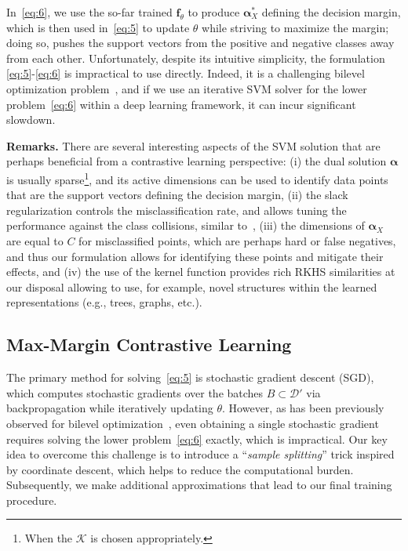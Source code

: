 \documentclass[letterpaper]{article} \usepackage{aaai22}  \usepackage{times}  \usepackage{helvet}  \usepackage{courier}  \usepackage[hyphens]{url}  \usepackage{graphicx} \urlstyle{rm} \def\UrlFont{\rm}  \usepackage{natbib}  \usepackage{caption} \DeclareCaptionStyle{ruled}{labelfont=normalfont,labelsep=colon,strut=off} \frenchspacing  \setlength{\pdfpagewidth}{8.5in}  \setlength{\pdfpageheight}{11in}
\newcommand{\valpha}{\bm{\alpha}}
\newcommand{\dataset}{\mathcal{D}}
\newcommand{\kernel}{\mathcal{K}}
\newcommand{\ft}{\bm{f}_\theta}
\begin{document}
In~\eqref{eq:6}, we use the so-far trained $\ft$ to produce $\valpha_X^*$ defining the decision margin, which is then used in~\eqref{eq:5} to update $\theta$ while striving to maximize the margin; doing so, pushes the support vectors from the positive and negative classes away from each other. Unfortunately, despite its intuitive simplicity, the formulation \eqref{eq:5}-\eqref{eq:6} is impractical to use directly. Indeed, it is a challenging bilevel optimization problem~\cite{gould2016differentiating,amos2017optnet,wang2018video}, and if we use an iterative SVM solver for the lower problem~\eqref{eq:6} within a deep learning framework, it can incur significant slowdown. 

\textbf{Remarks.} There are several interesting aspects of the SVM solution that are perhaps beneficial from a contrastive learning perspective: (i) the dual solution $\valpha$ is usually sparse\footnote{When the $\kernel$ is chosen appropriately.}, and its active dimensions can be used to identify data points that are the support vectors defining the decision margin, (ii) the slack regularization controls the misclassification rate, and allows tuning the performance against the class collisions, similar to~\cite{chuang2020debiased}, (iii) the dimensions of $\valpha_{X}$ are equal to $C$ for misclassified points, which are perhaps hard or false negatives, and thus our formulation allows for identifying these points and mitigate their effects, and (iv) the use of the kernel function provides rich RKHS similarities at our disposal allowing to use, for example, novel structures within the learned representations (e.g., trees, graphs, etc.). 

\subsection{Max-Margin Contrastive Learning}
\label{sec:mmcl}
The primary method for solving~\eqref{eq:5} is stochastic gradient descent (SGD), which computes stochastic gradients over the batches $B \subset \dataset'$ via backpropagation while iteratively updating $\theta$. However, as has been previously observed for bilevel optimization~\citep{amos2017optnet,gould2016differentiating}, even obtaining a single stochastic gradient requires solving the lower problem~\eqref{eq:6} exactly, which is impractical. Our key idea to overcome this challenge is to introduce a ``\emph{sample splitting}'' trick inspired by coordinate descent, which helps to reduce the computational burden. Subsequently, we make additional approximations that lead to our final training procedure.
\end{document}
